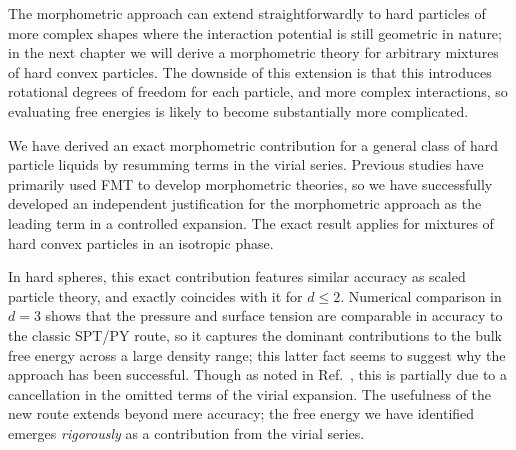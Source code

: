 \documentclass[11pt,twoside]{report}
\begin{document}
The morphometric approach can extend straightforwardly to hard particles of more complex shapes where the interaction potential is still geometric in nature; in the next chapter we will derive a morphometric theory for arbitrary mixtures of hard convex particles.
The downside of this extension is that this introduces rotational degrees of freedom for each particle, and more complex interactions, so evaluating free energies is likely to become substantially more complicated.

We have derived an exact morphometric contribution for a general class of hard particle liquids by resumming terms in the virial series.
Previous studies have primarily used FMT to develop morphometric theories, so we have successfully developed an independent justification for the morphometric approach as the leading term in a controlled expansion.
The exact result applies for mixtures of hard convex particles in an isotropic phase.


In hard spheres, this exact contribution features similar accuracy as scaled particle theory, and exactly coincides with it for $d \le 2$.
Numerical comparison in $d=3$ shows that the pressure and surface tension are comparable in accuracy to the classic SPT/PY route, so it captures the dominant contributions to the bulk free energy across a large density range; this latter fact seems to suggest why the approach has been successful.
Though as noted in Ref.\ \cite{MarechalPRE2014}, this is partially due to a cancellation in the omitted terms of the virial expansion.%
The usefulness of the new route extends beyond mere accuracy; the free energy we have identified emerges \emph{rigorously} as a contribution from the virial series.
\end{document}
